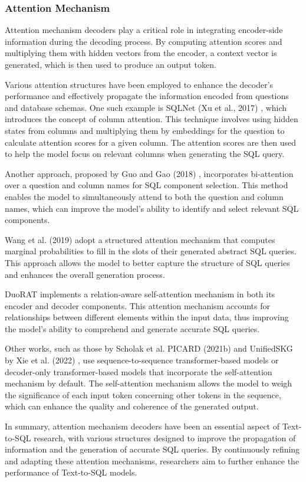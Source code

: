 \subsubsection{Attention Mechanism}

Attention mechanism decoders play a critical role in integrating encoder-side information during the decoding process. By computing attention scores and multiplying them with hidden vectors from the encoder, a context vector is generated, which is then used to produce an output token.

Various attention structures have been employed to enhance the decoder's performance and effectively propagate the information encoded from questions and database schemas. One such example is SQLNet (Xu et al., 2017) \cite{xu_sqlnet_2017}, which introduces the concept of column attention. This technique involves using hidden states from columns and multiplying them by embeddings for the question to calculate attention scores for a given column. The attention scores are then used to help the model focus on relevant columns when generating the SQL query.

Another approach, proposed by Guo and Gao (2018) \cite{guo2020content}, incorporates bi-attention over a question and column names for SQL component selection. This method enables the model to simultaneously attend to both the question and column names, which can improve the model's ability to identify and select relevant SQL components.

Wang et al. (2019) \cite{wang-etal-2019-learning} adopt a structured attention mechanism \cite{kim2017structured} that computes marginal probabilities to fill in the slots of their generated abstract SQL queries. This approach allows the model to better capture the structure of SQL queries and enhances the overall generation process.

DuoRAT \cite{scholak-etal-2021-duorat} implements a relation-aware self-attention mechanism in both its encoder and decoder components. This attention mechanism accounts for relationships between different elements within the input data, thus improving the model's ability to comprehend and generate accurate SQL queries.

Other works, such as those by Scholak et al. PICARD (2021b) \cite{Scholak2021:PICARD} and UnifiedSKG by Xie et al. (2022) \cite{xie2022unifiedskg}, use sequence-to-sequence transformer-based models or decoder-only transformer-based models that incorporate the self-attention mechanism by default. The self-attention mechanism allows the model to weigh the significance of each input token concerning other tokens in the sequence, which can enhance the quality and coherence of the generated output.

In summary, attention mechanism decoders have been an essential aspect of Text-to-SQL research, with various structures designed to improve the propagation of information and the generation of accurate SQL queries. By continuously refining and adapting these attention mechanisms, researchers aim to further enhance the performance of Text-to-SQL models.